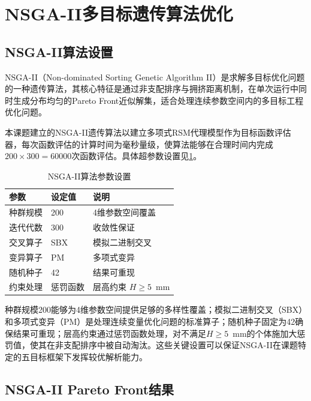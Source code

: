\section{NSGA-II多目标遗传算法优化}\label{sec:nsga2}

\subsection{NSGA-II算法设置}

NSGA-II（Non-dominated Sorting Genetic Algorithm II）是求解多目标优化问题的一种遗传算法，其核心特征是通过非支配排序与拥挤距离机制，在单次运行中同时生成分布均匀的Pareto Front近似解集，适合处理连续参数空间内的多目标工程优化问题。

本课题建立的NSGA-II遗传算法以建立多项式RSM代理模型作为目标函数评估器，每次函数评估的计算时间为毫秒量级，使算法能够在合理时间内完成$200 \times 300 = 60000$次函数评估。具体超参数设置见\cref{tab:5.6}。

\begin{table}[!htb]
  \centering
  \caption{NSGA-II算法参数设置}\label{tab:5.6}
  \renewcommand{\arraystretch}{1.3}
  \begin{tabular}{lll}
    \toprule
    \textbf{参数} & \textbf{设定值} & \textbf{说明} \\
    \midrule
    种群规模         & 200             & 4维参数空间覆盖 \\
    迭代代数         & 300             & 收敛性保证 \\
    交叉算子         & SBX             & 模拟二进制交叉 \\
    变异算子         & PM              & 多项式变异 \\
    随机种子         & 42              & 结果可重现 \\
    约束处理         & 惩罚函数        & 层高约束 $H \geq 5$~mm \\
    \bottomrule
  \end{tabular}
\end{table}

种群规模200能够为4维参数空间提供足够的多样性覆盖；模拟二进制交叉（SBX）和多项式变异（PM）是处理连续变量优化问题的标准算子；随机种子固定为42确保结果可重现；层高约束通过惩罚函数处理，对不满足$H \geq 5$~mm的个体施加大惩罚值，使其在非支配排序中被自动淘汰。这些关键设置可以保证NSGA-II在课题特定的五目标框架下发挥较优解析能力。

\subsection{NSGA-II Pareto Front结果}

